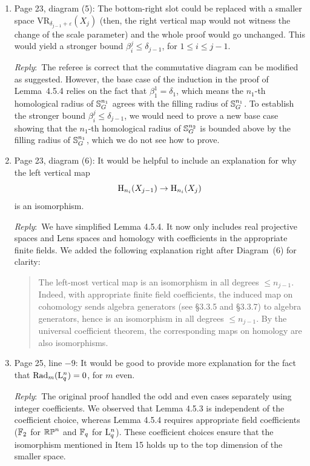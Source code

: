 \documentclass{amsart}
\newcommand{\ar}{\medskip\noindent\textit{Reply}:\ }
\begin{document}
\begin{enumerate}
		The values $r$ and $\epsilon$ remain arbitrary small positive numbers and are unchanged.

		\item Page 23, diagram (5): The bottom-right slot could be replaced with a smaller space $\mathrm{VR}_{\delta_{j-1} + \varepsilon}(X_j)$ (then, the right vertical map would not witness the change of the scale parameter) and the whole proof would go unchanged. This would yield a stronger bound $\beta_i^j \le \delta_{j-1}$, for $1 \le i \le j-1$.

		\ar The referee is correct that the commutative diagram can be modified as suggested.
		However, the base case of the induction in the proof of Lemma~4.5.4 relies on the fact that $\beta_1^1 = \delta_1$, which means the $n_1$-th homological radius of $\mathbb{S}^{n_1}_G$ agrees with the filling radius of $\mathbb{S}^{n_1}_G$.
		To establish the stronger bound $\beta_i^j \le \delta_{j-1}$, we would need to prove a new base case showing that the $n_1$-th homological radius of $\mathbb{S}^{n_2}_G$ is bounded above by the filling radius of $\mathbb{S}^{n_{1}}_G$, which we do not see how to prove.

		\item Page 23, diagram (6): It would be helpful to include an explanation for why the left vertical map
		\[
		\mathrm{H}_{n_i}(X_{j-1}) \to \mathrm{H}_{n_i}(X_j)
		\]
		is an isomorphism.

		\ar We have simplified Lemma 4.5.4. It now only includes real projective spaces and Lens spaces and homology with coefficients in the appropriate finite fields.
		We added the following explanation right after Diagram~(6) for clarity:

		\smallskip

		\begin{quote}
			The left-most vertical map is an isomorphism in all degrees $\le n_{j-1}$.
			Indeed, with appropriate finite field coefficients, the induced map on cohomology sends algebra generators (see \S3.3.5 and \S3.3.7) to algebra generators, hence is an isomorphism in all degrees $\le n_{j-1}$.
			By the universal coefficient theorem, the corresponding maps on homology are also isomorphisms.
		\end{quote}

		\item Page 25, line $-9$: It would be good to provide more explanation for the fact that $\operatorname{Rad}_m(\mathrm{L}_q^n) = 0$, for $m$ even.

		\ar The original proof handled the odd and even cases separately using integer coefficients.
		We observed that Lemma 4.5.3 is independent of the coefficient choice, whereas Lemma 4.5.4 requires appropriate field coefficients (${\mathbb{F}_2}$ for $\mathbb{RP}^n$ and $\mathbb{F}_q$ for $\mathrm{L}_q^n$).
		These coefficient choices ensure that the isomorphism mentioned in Item 15 holds up to the top dimension of the smaller space.
		

\end{enumerate}
\end{document}
